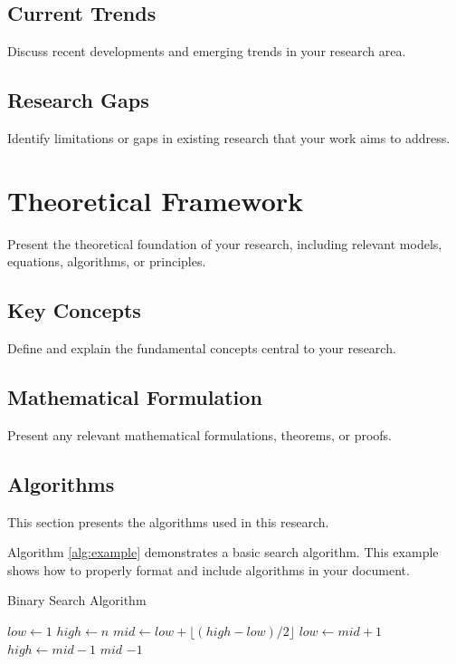 \documentclass[12pt,a4paper]{report}
\begin{document}
\section{Current Trends}
Discuss recent developments and emerging trends in your research area.

\section{Research Gaps}
Identify limitations or gaps in existing research that your work aims to address.

\chapter{Theoretical Framework}
Present the theoretical foundation of your research, including relevant models, equations, algorithms, or principles.

\section{Key Concepts}
Define and explain the fundamental concepts central to your research.

\section{Mathematical Formulation}
Present any relevant mathematical formulations, theorems, or proofs.

\section{Algorithms}
This section presents the algorithms used in this research.

Algorithm \ref{alg:example} demonstrates a basic search algorithm. This example shows how to properly format and include algorithms in your document.

\begin{algorithm}
\caption{Binary Search Algorithm}
\label{alg:example}
\begin{algorithmic}[1]
    \State $low \gets 1$
    \State $high \gets n$
        \State $mid \gets low + \lfloor (high - low) / 2 \rfloor$ 
            \State $low \gets mid + 1$
            \State $high \gets mid - 1$
        \Else
            \State \Return $mid$
        \EndIf
    \EndWhile
    \State \Return $-1$
\EndProcedure
\end{algorithmic}
\end{algorithm}
\end{document}
